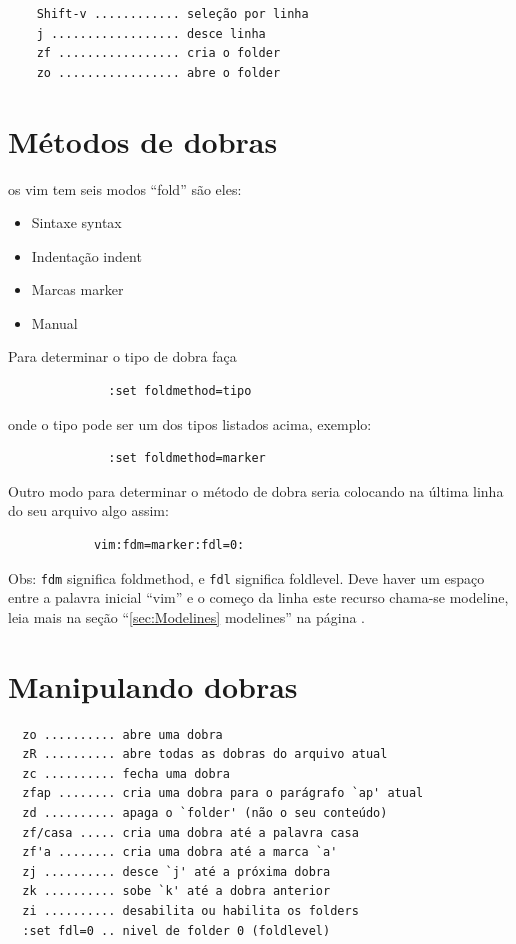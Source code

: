 \documentclass[10pt,a4paper,openany]{book}
\begin{document}
\begin{verbatim}
	Shift-v ............ seleção por linha
	j .................. desce linha
	zf ................. cria o folder
	zo ................. abre o folder
\end{verbatim}

\section{Métodos de dobras }
\label{Métodos de dobras }
os vim tem seis modos ``fold'' são eles:

\begin{itemize}
\item Sintaxe syntax
\item Indentação indent
\item Marcas marker
\item Manual
\end{itemize}

Para determinar o tipo de dobra faça

\begin{verbatim}
			  :set foldmethod=tipo
\end{verbatim}

onde o tipo pode ser um dos tipos listados acima, exemplo:

\begin{verbatim}
			  :set foldmethod=marker
\end{verbatim}

Outro modo para determinar o método de dobra seria colocando na última
linha do seu arquivo algo assim:

\begin{verbatim}
			vim:fdm=marker:fdl=0:
\end{verbatim}

Obs: \verb|fdm| significa foldmethod, e \verb|fdl| significa
foldlevel. Deve haver um espaço entre a palavra inicial ``vim'' e o
começo da linha este recurso chama-se modeline, leia mais na seção
``\ref{sec:Modelines} modelines'' na página \pageref{sec:Modelines}.

\section{Manipulando dobras }\label{Manipulando dobras }

\begin{verbatim}
  zo .......... abre uma dobra
  zR .......... abre todas as dobras do arquivo atual
  zc .......... fecha uma dobra
  zfap ........ cria uma dobra para o parágrafo `ap' atual
  zd .......... apaga o `folder' (não o seu conteúdo)
  zf/casa ..... cria uma dobra até a palavra casa
  zf'a ........ cria uma dobra até a marca `a'
  zj .......... desce `j' até a próxima dobra
  zk .......... sobe `k' até a dobra anterior
  zi .......... desabilita ou habilita os folders
  :set fdl=0 .. nivel de folder 0 (foldlevel)
\end{verbatim}
\end{document}
